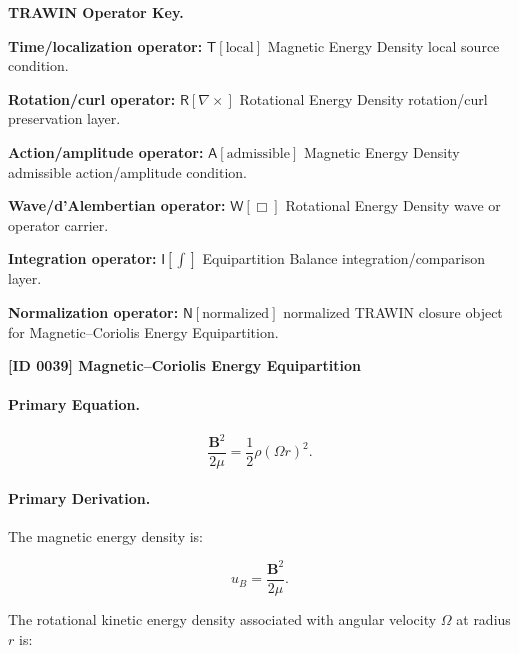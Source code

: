 \par\vspace{0.45\baselineskip}
\noindent\begin{minipage}[t]{\linewidth}
\begingroup
\small
\raggedright
\textbf{TRAWIN Operator Key.}\par
\noindent\textbf{Time/localization operator:} $\mathsf{T}\!\left[\mathrm{local}\right]$ Magnetic Energy Density local source condition.\par
\noindent\textbf{Rotation/curl operator:} $\mathsf{R}\!\left[\nabla\times\right]$ Rotational Energy Density rotation/curl preservation layer.\par
\noindent\textbf{Action/amplitude operator:} $\mathsf{A}\!\left[\mathrm{admissible}\right]$ Magnetic Energy Density admissible action/amplitude condition.\par
\noindent\textbf{Wave/d'Alembertian operator:} $\mathsf{W}\!\left[\Box\right]$ Rotational Energy Density wave or operator carrier.\par
\noindent\textbf{Integration operator:} $\mathsf{I}\!\left[\int\right]$ Equipartition Balance integration/comparison layer.\par
\noindent\textbf{Normalization operator:} $\mathsf{N}\!\left[\mathrm{normalized}\right]$ normalized TRAWIN closure object for Magnetic--Coriolis Energy Equipartition.\par
\endgroup
\end{minipage}

\clearpage
\noindent\textbf{[ID 0039] Magnetic--Coriolis Energy Equipartition}\par
\vspace{0.35em}
\paragraph{Primary Equation.}
\begin{equation}
\frac{\mathbf{B}^2}{2\mu}
=
\frac{1}{2}\rho(\Omega r)^2 .
\end{equation}

\paragraph{Primary Derivation.}
The magnetic energy density is:

\begin{equation}
u_B
=
\frac{\mathbf{B}^2}{2\mu}.
\end{equation}

The rotational kinetic energy density associated with angular velocity $\Omega$ at radius $r$ is:

